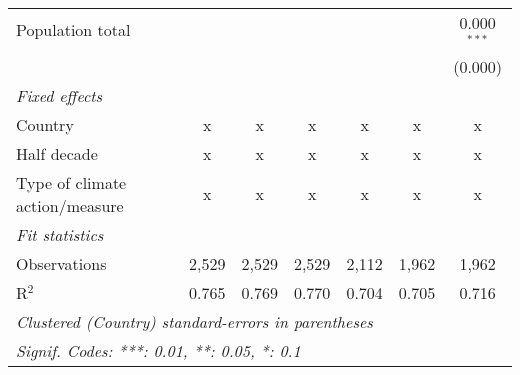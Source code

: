 \begin{tabular}{lcccccc}
   Population total                                                              &         &              &              &               &              & 0.000$^{***}$\\   
                                                                                 &         &              &              &               &              & (0.000)\\   
   \emph{Fixed effects}\\
   Country                                                                       & x       & x            & x            & x             & x            & x\\  
   Half decade                                                                   & x       & x            & x            & x             & x            & x\\  
   Type of climate action/measure                                                & x       & x            & x            & x             & x            & x\\  
   \midrule \emph{Fit statistics}\\
   Observations                                                                  & 2,529   & 2,529        & 2,529        & 2,112         & 1,962        & 1,962\\  
   R$^2$                                                                         & 0.765   & 0.769        & 0.770        & 0.704         & 0.705        & 0.716\\  
   \midrule
   \multicolumn{7}{l}{\emph{Clustered (Country) standard-errors in parentheses}}\\
   \multicolumn{7}{l}{\emph{Signif. Codes: ***: 0.01, **: 0.05, *: 0.1}}\\
\end{tabular}
\par\endgroup


